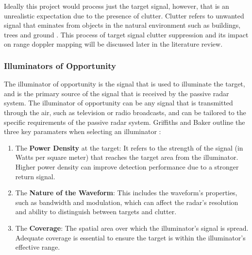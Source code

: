 \documentclass[12pt,a4paper]{article}
\begin{document}
\par \vspace{0.5cm} 
\noindent Ideally this project would process just the target signal, however, that is an unrealistic expectation due to the presence of clutter. Clutter refers to unwanted signal that eminates from objects in the natural environment such as buildings, trees and ground \cite{zhang2023intelligent}. This process of target signal clutter suppression and its impact on range doppler mapping will be discussed later in the literature review.  

\subsubsection{Illuminators of Opportunity}
The illuminator of opportunity is the signal that is used to illuminate the target, and is the primary source of the signal that is received by the passive radar system. The illuminator of opportunity can be any signal that is transmitted through the air, such as television or radio broadcasts, and can be tailored to the specific requirements of the passive radar system. Griffiths and Baker outline the three key paramaters when selecting an illuminator \cite{INTRO2017}:
\begin{enumerate}[label=\arabic*.]
    \item The \textbf{Power Density} at the target: It refers to the strength of the signal (in Watts per square meter) that reaches the target area from the illuminator. Higher power density can improve detection performance due to a stronger return signal.
    \item The \textbf{Nature of the Waveform}: This includes the waveform's properties, such as bandwidth and modulation, which can affect the radar's resolution and ability to distinguish between targets and clutter.
    \item The \textbf{Coverage}: The spatial area over which the illuminator's signal is spread. Adequate coverage is essential to ensure the target is within the illuminator's effective range.
\end{enumerate}
\end{document}
